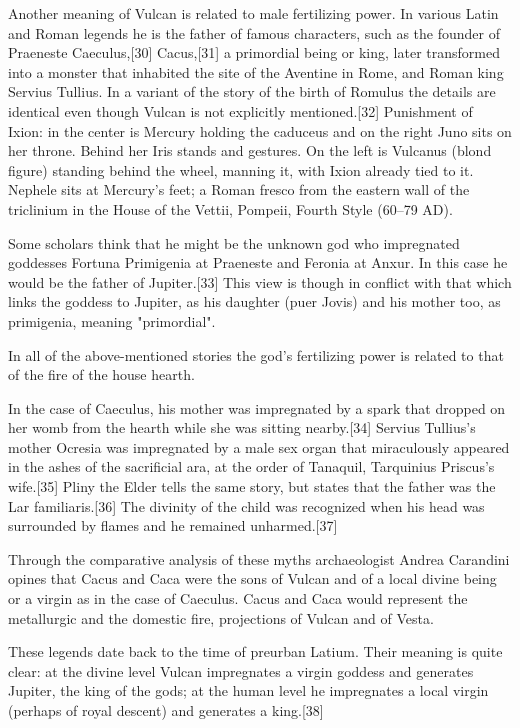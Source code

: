 Another meaning of Vulcan is related to male fertilizing power. In various Latin and Roman legends he is the father of famous characters, such as the founder of Praeneste Caeculus,[30] Cacus,[31] a primordial being or king, later transformed into a monster that inhabited the site of the Aventine in Rome, and Roman king Servius Tullius. In a variant of the story of the birth of Romulus the details are identical even though Vulcan is not explicitly mentioned.[32]
Punishment of Ixion: in the center is Mercury holding the caduceus and on the right Juno sits on her throne. Behind her Iris stands and gestures. On the left is Vulcanus (blond figure) standing behind the wheel, manning it, with Ixion already tied to it. Nephele sits at Mercury's feet; a Roman fresco from the eastern wall of the triclinium in the House of the Vettii, Pompeii, Fourth Style (60–79 AD).

Some scholars think that he might be the unknown god who impregnated goddesses Fortuna Primigenia at Praeneste and Feronia at Anxur. In this case he would be the father of Jupiter.[33] This view is though in conflict with that which links the goddess to Jupiter, as his daughter (puer Jovis) and his mother too, as primigenia, meaning "primordial".

In all of the above-mentioned stories the god's fertilizing power is related to that of the fire of the house hearth.

In the case of Caeculus, his mother was impregnated by a spark that dropped on her womb from the hearth while she was sitting nearby.[34] Servius Tullius's mother Ocresia was impregnated by a male sex organ that miraculously appeared in the ashes of the sacrificial ara, at the order of Tanaquil, Tarquinius Priscus's wife.[35] Pliny the Elder tells the same story, but states that the father was the Lar familiaris.[36] The divinity of the child was recognized when his head was surrounded by flames and he remained unharmed.[37]

Through the comparative analysis of these myths archaeologist Andrea Carandini opines that Cacus and Caca were the sons of Vulcan and of a local divine being or a virgin as in the case of Caeculus. Cacus and Caca would represent the metallurgic and the domestic fire, projections of Vulcan and of Vesta.

These legends date back to the time of preurban Latium. Their meaning is quite clear: at the divine level Vulcan impregnates a virgin goddess and generates Jupiter, the king of the gods; at the human level he impregnates a local virgin (perhaps of royal descent) and generates a king.[38]

